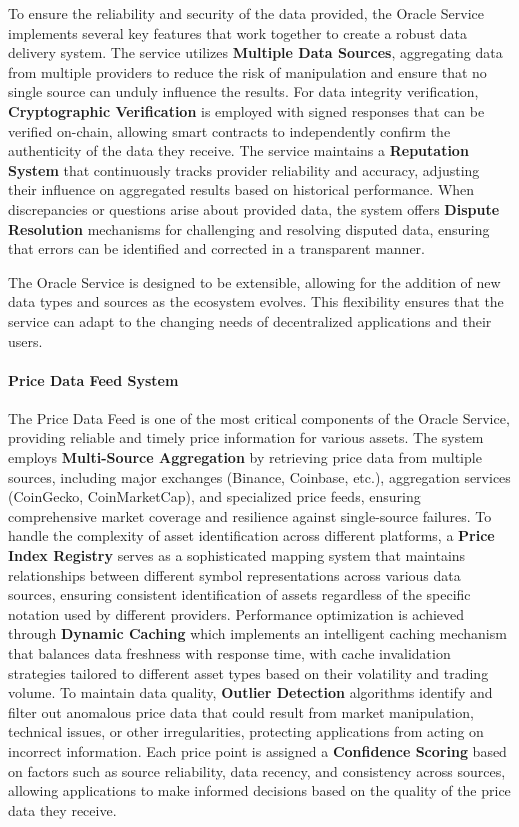 \documentclass[11pt]{article}
\begin{document}
To ensure the reliability and security of the data provided, the Oracle Service implements several key features that work together to create a robust data delivery system. The service utilizes \textbf{Multiple Data Sources}, aggregating data from multiple providers to reduce the risk of manipulation and ensure that no single source can unduly influence the results. For data integrity verification, \textbf{Cryptographic Verification} is employed with signed responses that can be verified on-chain, allowing smart contracts to independently confirm the authenticity of the data they receive. The service maintains a \textbf{Reputation System} that continuously tracks provider reliability and accuracy, adjusting their influence on aggregated results based on historical performance. When discrepancies or questions arise about provided data, the system offers \textbf{Dispute Resolution} mechanisms for challenging and resolving disputed data, ensuring that errors can be identified and corrected in a transparent manner.

The Oracle Service is designed to be extensible, allowing for the addition of new data types and sources as the ecosystem evolves. This flexibility ensures that the service can adapt to the changing needs of decentralized applications and their users.



\paragraph{Price Data Feed System}
The Price Data Feed is one of the most critical components of the Oracle Service, providing reliable and timely price information for various assets. The system employs \textbf{Multi-Source Aggregation} by retrieving price data from multiple sources, including major exchanges (Binance, Coinbase, etc.), aggregation services (CoinGecko, CoinMarketCap), and specialized price feeds, ensuring comprehensive market coverage and resilience against single-source failures. To handle the complexity of asset identification across different platforms, a \textbf{Price Index Registry} serves as a sophisticated mapping system that maintains relationships between different symbol representations across various data sources, ensuring consistent identification of assets regardless of the specific notation used by different providers. Performance optimization is achieved through \textbf{Dynamic Caching} which implements an intelligent caching mechanism that balances data freshness with response time, with cache invalidation strategies tailored to different asset types based on their volatility and trading volume. To maintain data quality, \textbf{Outlier Detection} algorithms identify and filter out anomalous price data that could result from market manipulation, technical issues, or other irregularities, protecting applications from acting on incorrect information. Each price point is assigned a \textbf{Confidence Scoring} based on factors such as source reliability, data recency, and consistency across sources, allowing applications to make informed decisions based on the quality of the price data they receive.
\end{document}
